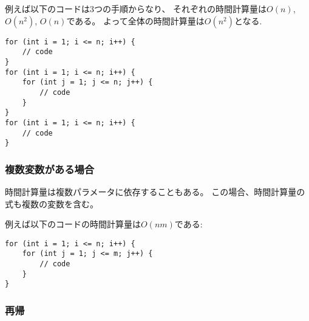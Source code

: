 例えば以下のコードは3つの手順からなり、
それぞれの時間計算量は$O(n)$, $O(n^2)$, $O(n)$である。
よって全体の時間計算量は$O(n^2)$となる.

\begin{lstlisting}
for (int i = 1; i <= n; i++) {
    // code
}
for (int i = 1; i <= n; i++) {
    for (int j = 1; j <= n; j++) {
        // code
    }
}
for (int i = 1; i <= n; i++) {
    // code
}
\end{lstlisting}

\begin{comment}
\subsubsection*{Several variables}

Sometimes the time complexity depends on
several factors.
In this case, the time complexity formula
contains several variables.

For example, the time complexity of the
following code is $O(nm)$:
\end{comment}

\subsubsection*{複数変数がある場合}

時間計算量は複数パラメータに依存することもある。
この場合、時間計算量の式も複数の変数を含む。

例えば以下のコードの時間計算量は$O(nm)$である:

\begin{lstlisting}
for (int i = 1; i <= n; i++) {
    for (int j = 1; j <= m; j++) {
        // code
    }
}
\end{lstlisting}

\begin{comment}
\subsubsection*{Recursion}

The time complexity of a recursive function
depends on the number of times the function is called
and the time complexity of a single call.
The total time complexity is the product of
these values.

For example, consider the following function:
\end{comment}

\subsubsection*{再帰}

